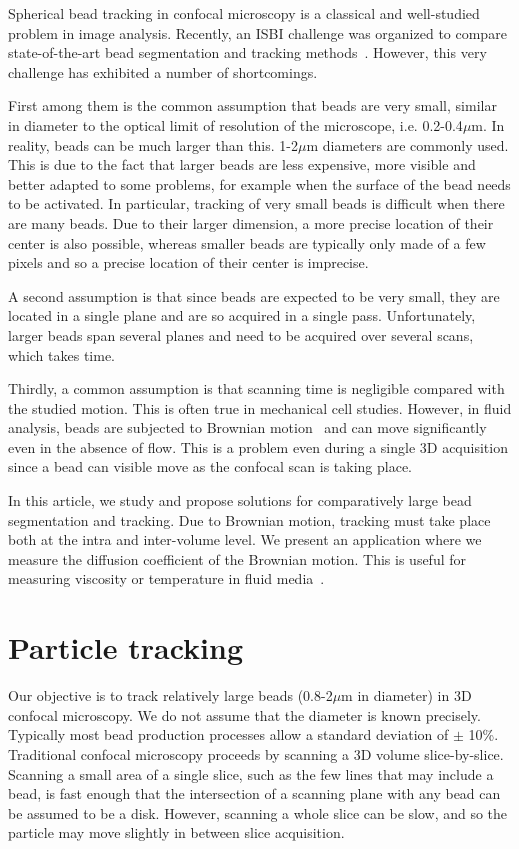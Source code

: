 \documentclass{llncs}
\begin{document}
Spherical bead tracking in confocal microscopy is a classical and well-studied problem in image analysis. Recently, an ISBI challenge was organized to compare state-of-the-art bead segmentation and tracking methods~\cite{chenouard2014objective}. However, this very challenge has exhibited a number of shortcomings.

First among them is the common assumption that beads are very small, similar in diameter to the optical limit of resolution of the microscope, i.e. 0.2-0.4$\mu$m. In reality, beads can be much larger than this. 1-2$\mu$m diameters are commonly used. This is due to the fact that larger beads are less expensive, more visible and better adapted to some problems, for example when the surface of the bead needs to be activated. In particular, tracking of very small beads is difficult when there are many beads. Due to their larger dimension, a more precise location of their center is also possible, whereas smaller beads are typically only made of a few pixels and so a precise location of their center is imprecise.

A second assumption is that since beads are expected to be very small, they are located in a single plane and are so acquired in a single pass. Unfortunately, larger beads span several planes and need to be acquired over several scans, which takes time.

Thirdly, a common assumption is that scanning time is negligible compared with the studied motion. This is often true in mechanical cell studies. However, in fluid analysis, beads are subjected to Brownian motion~\cite{Brown:Motion:1828} and can move significantly even in the absence of flow. This is a problem even during a single 3D acquisition since a bead can visible move as the confocal scan is taking place.

In this article, we study and propose solutions for comparatively large bead segmentation and tracking. Due to Brownian motion, tracking must take place both at the intra and inter-volume level. We present an application where we measure the diffusion coefficient of the Brownian motion. This is useful for measuring viscosity or temperature in fluid media~\cite{puybareau2017morphological}.


\section{Particle tracking}\label{sec:tracking}
Our objective is to track relatively large beads (0.8-2$\mu$m in diameter) in 3D confocal microscopy. We do not assume that the diameter is known precisely. Typically most bead production processes allow a standard deviation of $\pm$ 10\%. Traditional confocal microscopy proceeds by scanning a 3D volume slice-by-slice. Scanning a small area of a single slice, such as the few lines that may include a bead, is fast enough that the intersection of a scanning plane with any bead can be assumed to be a disk. However, scanning a whole slice can be slow, and so the particle may move slightly in between slice acquisition. 
\end{document}
